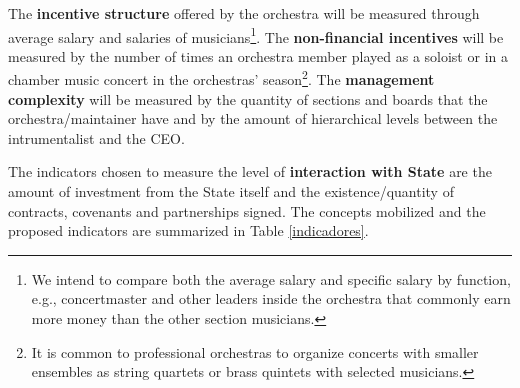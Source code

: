 \documentclass[a4paper, 12pt, openright, oneside, german, french, brazil, english]{abntex2}
\begin{document}
	The \textbf{incentive structure} offered by the orchestra will be measured through average salary and salaries of musicians\footnote{We intend to compare both the average salary and specific salary by function, e.g., concertmaster and other leaders inside the orchestra that commonly earn more money than the other section musicians.}. The \textbf{non-financial incentives} will be measured by the number of times an orchestra member played as a soloist or in a chamber music concert in the orchestras' season\footnote{It is common to professional orchestras to organize concerts with smaller ensembles as string quartets or brass quintets with selected musicians.}. The \textbf{management complexity} will be measured by the quantity of sections and boards that the orchestra/maintainer have and by the amount of hierarchical levels between the intrumentalist and the CEO.
	
	
	The indicators chosen to measure the level of \textbf{interaction with State} are the amount of investment from the State itself and the existence/quantity of contracts, covenants and partnerships signed. The concepts mobilized and the proposed indicators are summarized in Table \ref{indicadores}.
	
	
\end{document}
